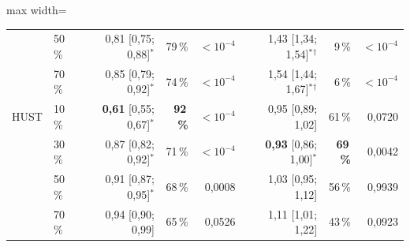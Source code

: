 \begin{table}[!htbp]
\begin{adjustbox}{max width=\textwidth}
\begin{tabular}{llrrrrrr}
 & 50\,\% & 0{,}81 [0{,}75; 0{,}88]$^{*}$ & 79\,\% & $<10^{-4}$ & 1{,}43 [1{,}34; 1{,}54]$^{*}$$^{\dagger}$ & 9\,\% & $<10^{-4}$ \\
 & 70\,\% & 0{,}85 [0{,}79; 0{,}92]$^{*}$ & 74\,\% & $<10^{-4}$ & 1{,}54 [1{,}44; 1{,}67]$^{*}$$^{\dagger}$ & 6\,\% & $<10^{-4}$ \\
HUST & 10\,\% & \textbf{0{,}61} [0{,}55; 0{,}67]$^{*}$ & \textbf{92\,\%} & $<10^{-4}$ & 0{,}95 [0{,}89; 1{,}02] & 61\,\% & 0{,}0720 \\
 & 30\,\% & 0{,}87 [0{,}82; 0{,}92]$^{*}$ & 71\,\% & $<10^{-4}$ & \textbf{0{,}93} [0{,}86; 1{,}00]$^{*}$ & \textbf{69\,\%} & 0{,}0042 \\
 & 50\,\% & 0{,}91 [0{,}87; 0{,}95]$^{*}$ & 68\,\% & 0{,}0008 & 1{,}03 [0{,}95; 1{,}12] & 56\,\% & 0{,}9939 \\
 & 70\,\% & 0{,}94 [0{,}90; 0{,}99] & 65\,\% & 0{,}0526 & 1{,}11 [1{,}01; 1{,}22] & 43\,\% & 0{,}0923 \\
\bottomrule\end{tabular}\end{adjustbox}\end{table}
